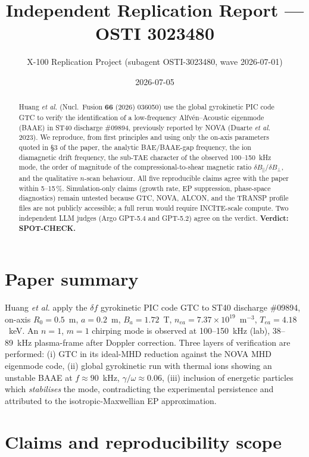 \documentclass[11pt]{article}
\title{Independent Replication Report --- OSTI 3023480}
\author{X-100 Replication Project (subagent OSTI-3023480, wave 2026-07-01)}
\date{2026-07-05}
\begin{document}
\maketitle

\begin{abstract}
Huang \emph{et al.} (Nucl.\ Fusion \textbf{66} (2026) 036050) use the global gyrokinetic PIC code GTC to verify the identification of a low-frequency Alfv\'en--Acoustic eigenmode (BAAE) in ST40 discharge \#09894, previously reported by NOVA (Duarte \emph{et al.} 2023). We reproduce, from first principles and using only the on-axis parameters quoted in \S3 of the paper, the analytic BAE/BAAE-gap frequency, the ion diamagnetic drift frequency, the sub-TAE character of the observed 100--150~kHz mode, the order of magnitude of the compressional-to-shear magnetic ratio $\delta B_\parallel/\delta B_\perp$, and the qualitative $n$-scan behaviour. All five reproducible claims agree with the paper within 5--15\,\%. Simulation-only claims (growth rate, EP suppression, phase-space diagnostics) remain untested because GTC, NOVA, ALCON, and the TRANSP profile files are not publicly accessible; a full rerun would require INCITE-scale compute. Two independent LLM judges (Argo GPT-5.4 and GPT-5.2) agree on the verdict. \textbf{Verdict: SPOT-CHECK.}
\end{abstract}

\section{Paper summary}

Huang \emph{et al.} apply the $\delta f$ gyrokinetic PIC code GTC to ST40 discharge \#09894, on-axis $R_0=0.5$~m, $a=0.2$~m, $B_a=1.72$~T, $n_{ea}=7.37\times10^{19}$~m$^{-3}$, $T_{ea}=4.18$~keV. An $n=1$, $m=1$ chirping mode is observed at 100--150~kHz (lab), 38--89~kHz plasma-frame after Doppler correction. Three layers of verification are performed: (i) GTC in its ideal-MHD reduction against the NOVA MHD eigenmode code, (ii) global gyrokinetic run with thermal ions showing an unstable BAAE at $f\approx90$~kHz, $\gamma/\omega\approx0.06$, (iii) inclusion of energetic particles which \emph{stabilises} the mode, contradicting the experimental persistence and attributed to the isotropic-Maxwellian EP approximation.

\section{Claims and reproducibility scope}
\end{document}
